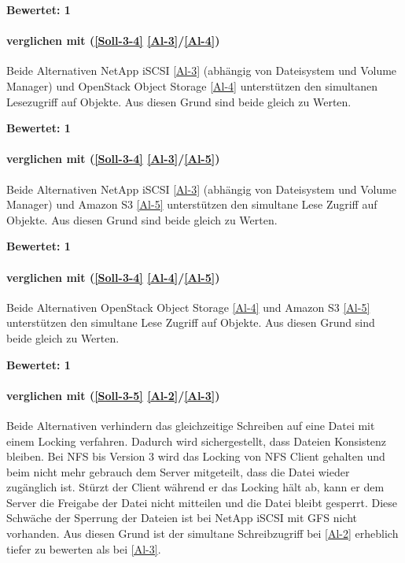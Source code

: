 \textbf{Bewertet: 1}

\paragraph*{  verglichen mit  (\ref{Soll-3-4} \ref{Al-3}/\ref{Al-4})}
Beide Alternativen NetApp iSCSI \ref{Al-3} (abhängig von Dateisystem und Volume Manager) und OpenStack Object Storage \ref{Al-4} unterstützen den simultanen Lesezugriff auf Objekte. Aus diesen Grund sind beide gleich zu Werten.

\textbf{Bewertet: 1}

\paragraph*{  verglichen mit  (\ref{Soll-3-4} \ref{Al-3}/\ref{Al-5})}
Beide Alternativen NetApp iSCSI \ref{Al-3} (abhängig von Dateisystem und Volume Manager) und Amazon S3 \ref{Al-5} unterstützen den simultane Lese Zugriff auf Objekte. Aus diesen Grund sind beide gleich zu Werten.

\textbf{Bewertet: 1}


\paragraph*{  verglichen mit  (\ref{Soll-3-4} \ref{Al-4}/\ref{Al-5})}
Beide Alternativen OpenStack Object Storage \ref{Al-4} und Amazon S3 \ref{Al-5} unterstützen den simultane Lese Zugriff auf Objekte. Aus diesen Grund sind beide gleich zu Werten.


\textbf{Bewertet: 1}


\paragraph*{  verglichen mit  (\ref{Soll-3-5} \ref{Al-2}/\ref{Al-3})}
Beide Alternativen verhindern das gleichzeitige Schreiben auf eine Datei mit einem Locking verfahren. Dadurch wird sichergestellt, dass Dateien Konsistenz bleiben. Bei NFS bis Version 3 wird das Locking von NFS Client gehalten und beim nicht mehr gebrauch dem Server mitgeteilt, dass die Datei wieder zugänglich ist. Stürzt der Client während er das Locking hält ab, kann er dem Server die Freigabe der Datei nicht mitteilen und die Datei bleibt gesperrt. 
Diese Schwäche der Sperrung der Dateien ist bei NetApp iSCSI mit GFS nicht vorhanden. Aus diesen Grund ist der simultane Schreibzugriff bei  \ref{Al-2} erheblich tiefer zu bewerten als bei  \ref{Al-3}.

